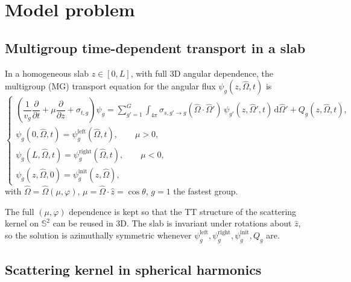 \documentclass[11pt,a4paper]{article}
\numberwithin{equation}{section}
\theoremstyle{remark}
\newcommand{\Om}{\hat{\Omega}}
\newcommand{\dd}{\mathrm{d}}
\begin{document}
\section{Model problem}
\label{sec:model}

\subsection{Multigroup time-dependent transport in a slab}

In a homogeneous slab $z\in[0,L]$, with full 3D angular dependence, the multigroup (MG) transport equation for the angular flux $\psi_g(z,\Om,t)$ is
\begin{equation}
\begin{cases}
\left(\dfrac{1}{v_g}\dfrac{\partial}{\partial t}+\mu\dfrac{\partial}{\partial z}+\sigma_{t,g}\right)\psi_g
=\displaystyle\sum_{g'=1}^{G}\int_{4\pi}\sigma_{s,g'\to g}(\Om\cdot\Om')\,\psi_{g'}(z,\Om',t)\,\dd\Om'+Q_g(z,\Om,t),\\[3mm]
\psi_g(0,\Om,t)=\psi^{\mathrm{left}}_{g}(\Om,t), \qquad \mu>0,\\[1mm]
\psi_g(L,\Om,t)=\psi^{\mathrm{right}}_{g}(\Om,t), \qquad \mu<0,\\[1mm]
\psi_g(z,\Om,0)=\psi^{\mathrm{init}}_{g}(z,\Om),
\end{cases}
\label{eq:MGNTE}
\end{equation}
with $\Om=\Om(\mu,\varphi)$, $\mu=\Om\cdot\hat z=\cos\theta$, $g=1$ the fastest group.

The full $(\mu,\varphi)$ dependence is kept so that the TT structure of the scattering kernel on $\mathbb{S}^2$ can be reused in 3D. The slab is invariant under rotations about $\hat z$, so the solution is azimuthally symmetric whenever $\psi^{\mathrm{left}}_g,\psi^{\mathrm{right}}_g,\psi^{\mathrm{init}}_g,Q_g$ are.

\subsection{Scattering kernel in spherical harmonics}
\label{sec:kernel}
\end{document}
